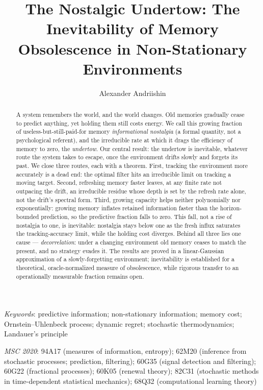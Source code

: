 \documentclass[12pt]{iopart}
\begin{document}
\title[The Nostalgic Undertow]{The Nostalgic Undertow: The Inevitability of Memory Obsolescence in Non-Stationary Environments}

\author{Alexander Andriishin}

\address{Independent researcher; ORCID 0009-0000-4739-4017; alexander@andriishin.com}

\begin{abstract}
A system remembers the world, and the world changes. Old memories gradually cease to predict anything, yet holding them still costs energy. We call this growing fraction of useless-but-still-paid-for memory \emph{informational nostalgia} (a formal quantity, not a psychological referent), and the irreducible rate at which it drags the efficiency of memory to zero, the \emph{undertow}. Our central result: the undertow is inevitable, whatever route the system takes to escape, once the environment drifts slowly and forgets its past. We close three routes, each with a theorem. First, tracking the environment more accurately is a dead end: the optimal filter hits an irreducible limit on tracking a moving target. Second, refreshing memory faster leaves, at any finite rate not outpacing the drift, an irreducible residue whose depth is set by the refresh rate alone, not the drift's spectral form. Third, growing capacity helps neither polynomially nor exponentially: growing memory inflates retained information faster than the horizon-bounded prediction, so the predictive fraction falls to zero. This fall, not a rise of nostalgia to one, is inevitable: nostalgia stays below one as the fresh influx saturates the tracking-accuracy limit, while the holding cost diverges. Behind all three lies one cause --- \emph{decorrelation}: under a changing environment old memory ceases to match the present, and no strategy evades it. The results are proved in a linear-Gaussian approximation of a slowly-forgetting environment; inevitability is established for a theoretical, oracle-normalized measure of obsolescence, while rigorous transfer to an operationally measurable fraction remains open.
\end{abstract}

\medskip\noindent\textit{Keywords}: predictive information; non-stationary information; memory cost; Ornstein–Uhlenbeck process; dynamic regret; stochastic thermodynamics; Landauer's principle

\medskip\noindent\textit{MSC 2020}: 94A17 (measures of information, entropy); 62M20 (inference from stochastic processes; prediction, filtering); 60G35 (signal detection and filtering); 60G22 (fractional processes); 60K05 (renewal theory); 82C31 (stochastic methods in time-dependent statistical mechanics); 68Q32 (computational learning theory)
\end{document}

